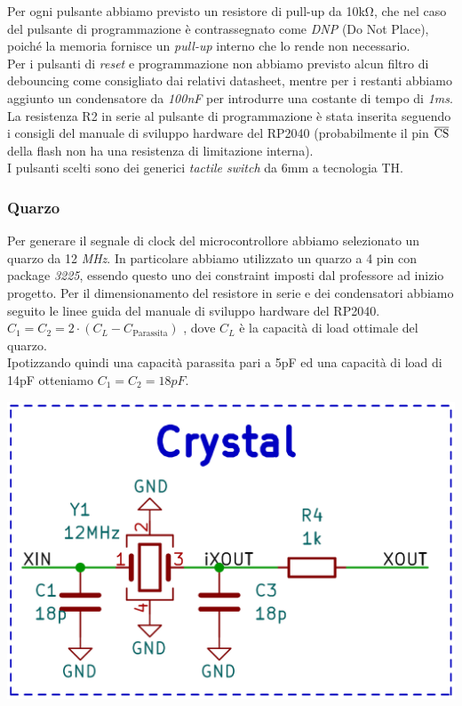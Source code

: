 \noindent Per ogni pulsante abbiamo previsto un resistore di pull-up da 10kΩ, che
nel caso del pulsante di programmazione è contrassegnato come \emph{DNP}
(Do Not Place), poiché la memoria fornisce un \emph{pull-up} interno che
lo rende non necessario.\\
Per i pulsanti di \emph{reset} e programmazione non abbiamo previsto
alcun filtro di debouncing come consigliato dai relativi datasheet,
mentre per i restanti abbiamo aggiunto un condensatore da \emph{100nF}
per introdurre una costante di tempo di \emph{1ms}.\\
La resistenza R2 in serie al pulsante di programmazione è stata inserita
seguendo i consigli del manuale di sviluppo hardware del RP2040
(probabilmente il pin $\overline{\rm {CS}}$ della flash non ha una
resistenza di limitazione interna).\\
I pulsanti scelti sono dei generici \emph{tactile switch} da 6mm a
tecnologia TH.

\hypertarget{quarzo}{%
\subsubsection{Quarzo}\label{quarzo}}

Per generare il segnale di clock del microcontrollore abbiamo
selezionato un quarzo da 12 \emph{MHz}. In particolare abbiamo
utilizzato un quarzo a 4 pin con package \emph{3225}, essendo questo uno
dei constraint imposti dal professore ad inizio progetto. Per il
dimensionamento del resistore in serie e dei condensatori abbiamo
seguito le linee guida del manuale di sviluppo hardware del RP2040.\\
\(C_{1} = C_{2} = 2 \cdot (C_{L} - C_{\text{Parassita}})\)
, dove \(C_{L}\) è la capacità di load ottimale del quarzo.\\
Ipotizzando quindi una capacità parassita pari a 5pF ed una capacità di
load di 14pF otteniamo \(C_{1} = C_{2} =18pF\).

\begin{center}
\includegraphics[scale=0.2]{figures/image76.png}
\captionsetup{type=figure}
\end{center}

